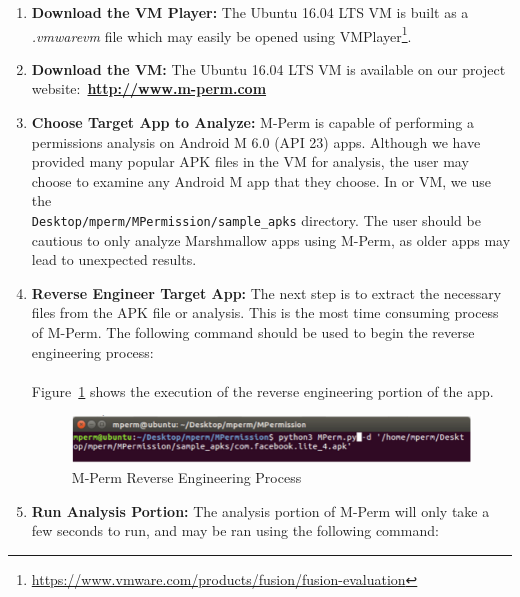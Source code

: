 \documentclass{sig-alternate-05-2015}
\begin{document}
\begin{enumerate}
	\item \textbf{Download the VM Player:} The Ubuntu 16.04 LTS VM is built as a \emph{.vmwarevm} file which may easily be opened using VMPlayer\footnote{\url{https://www.vmware.com/products/fusion/fusion-evaluation}}.
	
	\item \textbf{Download the VM:} The Ubuntu 16.04 LTS VM is available on our project website:~\textbf{\url{http://www.m-perm.com}}
	
	
	\item \textbf{Choose Target App to Analyze:} M-Perm is capable of performing a permissions analysis on Android M 6.0 (API 23) apps. Although we have provided many popular APK files in the VM for analysis, the user may choose to examine any Android M app that they choose. In or VM, we use the \\ \texttt{Desktop/mperm/MPermission/sample\_apks} directory. The user should be cautious to only analyze Marshmallow apps using M-Perm, as older apps may lead to unexpected results.
	
	\item \textbf{Reverse Engineer Target App:} The next step is to extract the necessary files from the APK file or analysis. This is the most time consuming process of M-Perm. The following command should be used to begin the reverse engineering process: \\
	
	\noindent
	\\
	
	Figure~\ref{fig:mperm-d} shows the execution of the reverse engineering portion of the app. \\
	
	
	\begin{figure}[h!]
	\centering
	\includegraphics[width=\columnwidth, angle = 0, scale=1.59]{images/screencast/mperm-d.png}
	\caption{M-Perm Reverse Engineering Process}
	\label{fig:mperm-d}
	\end{figure}
	
	
	
	\item \textbf{Run Analysis Portion:} The analysis portion of M-Perm will only take a few seconds to run, and may be ran using the following command:
	

\end{enumerate}
\end{document}
